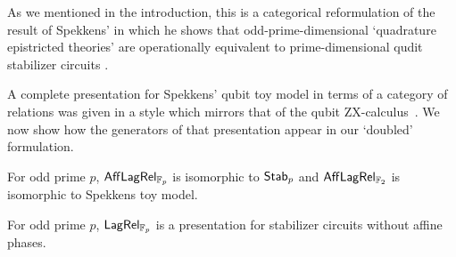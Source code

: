 As we mentioned in the introduction, this is a categorical reformulation of the result of Spekkens' in which he shows that odd-prime-dimensional `quadrature epistricted theories' are operationally equivalent to prime-dimensional qudit stabilizer circuits \cite{spekkens2016quasi}.



A complete presentation for Spekkens' qubit toy model in terms of a category of relations was given \cite{backensspek} in a style which mirrors that of the qubit ZX-calculus~\cite{coecke2008interacting}. We now show how the generators of that presentation appear in our `doubled' formulation.




\begin{theorem}
For odd prime $p$, $\mathsf{Aff}\mathsf{Lag}\mathsf{Rel}_{\mathbb{F}_p}$ is isomorphic to ${\sf Stab}_p$ and 
$\mathsf{Aff}\mathsf{Lag}\mathsf{Rel}_{\mathbb{F}_2}$ is isomorphic to Spekkens toy model.
\end{theorem}

\begin{corollary}
For odd prime $p$, $\mathsf{Lag}\mathsf{Rel}_{\mathbb{F}_p}$ is a presentation for stabilizer circuits without affine phases. 
\end{corollary}

